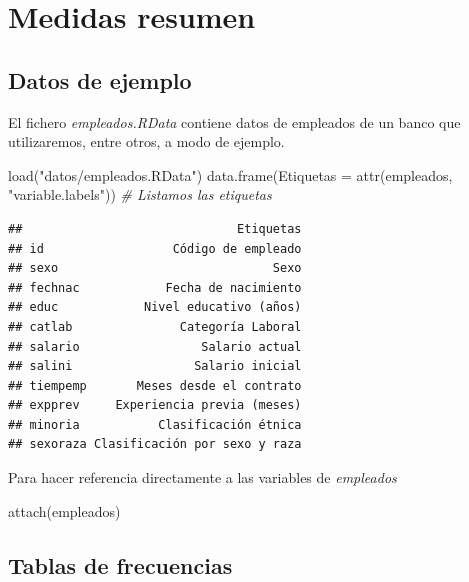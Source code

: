 \documentclass[
]{book}
\newenvironment{Shaded}{\begin{snugshade}}{\end{snugshade}}
\newcommand{\AttributeTok}[1]{\textcolor[rgb]{0.77,0.63,0.00}{#1}}
\newcommand{\CommentTok}[1]{\textcolor[rgb]{0.56,0.35,0.01}{\textit{#1}}}
\newcommand{\FunctionTok}[1]{\textcolor[rgb]{0.00,0.00,0.00}{#1}}
\newcommand{\NormalTok}[1]{#1}
\newcommand{\StringTok}[1]{\textcolor[rgb]{0.31,0.60,0.02}{#1}}
\theoremstyle{break}
\theoremstyle{nonumberplain}
\begin{document}
\hypertarget{medidas-resumen}{%
\section{Medidas resumen}\label{medidas-resumen}}

\hypertarget{datos-de-ejemplo}{%
\subsection{Datos de ejemplo}\label{datos-de-ejemplo}}

El fichero \emph{empleados.RData} contiene datos de empleados de un banco que utilizaremos,
entre otros, a modo de ejemplo.

\begin{Shaded}
\begin{Highlighting}[]
\FunctionTok{load}\NormalTok{(}\StringTok{"datos/empleados.RData"}\NormalTok{)}
\FunctionTok{data.frame}\NormalTok{(}\AttributeTok{Etiquetas =} \FunctionTok{attr}\NormalTok{(empleados, }\StringTok{"variable.labels"}\NormalTok{))  }\CommentTok{\# Listamos las etiquetas}
\end{Highlighting}
\end{Shaded}

\begin{verbatim}
##                              Etiquetas
## id                  Código de empleado
## sexo                              Sexo
## fechnac            Fecha de nacimiento
## educ            Nivel educativo (años)
## catlab               Categoría Laboral
## salario                 Salario actual
## salini                 Salario inicial
## tiempemp       Meses desde el contrato
## expprev     Experiencia previa (meses)
## minoria           Clasificación étnica
## sexoraza Clasificación por sexo y raza
\end{verbatim}

Para hacer referencia directamente a las variables de \emph{empleados}

\begin{Shaded}
\begin{Highlighting}[]
\FunctionTok{attach}\NormalTok{(empleados)}
\end{Highlighting}
\end{Shaded}

\hypertarget{tablas-de-frecuencias}{%
\subsection{Tablas de frecuencias}\label{tablas-de-frecuencias}}
\end{document}

